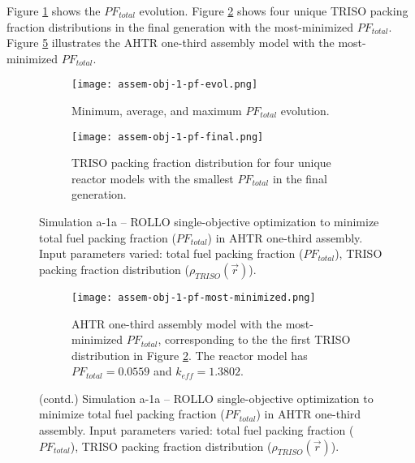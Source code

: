 Figure \ref{fig:assem-obj-1-pf-evol} shows the $PF_{total}$ evolution.
Figure \ref{fig:assem-obj-1-pf-final} shows four unique TRISO packing fraction distributions 
in the final generation with the most-minimized $PF_{total}$. 
Figure \ref{fig:assem-obj-1-pf-most-minimized} illustrates the \gls{AHTR} one-third 
assembly model with the most-minimized $PF_{total}$.
\begin{figure}[htbp!]
    \centering
    \begin{subfigure}{\textwidth}
        \texttt{[image: assem-obj-1-pf-evol.png]}
        \caption{Minimum, average, and maximum $PF_{total}$ evolution.}
        \label{fig:assem-obj-1-pf-evol} 
    \end{subfigure}
    \begin{subfigure}{\textwidth}
        \texttt{[image: assem-obj-1-pf-final.png]}
        \caption{TRISO packing fraction distribution for four unique reactor models with the 
        smallest $PF_{total}$ in the final generation.}
        \label{fig:assem-obj-1-pf-final} 
    \end{subfigure}
    \caption{Simulation a-1a -- ROLLO single-objective optimization to minimize total 
    fuel packing fraction ($PF_{total}$) in \gls{AHTR} one-third assembly. 
    Input parameters varied: total fuel packing fraction 
    ($PF_{total}$), \gls{TRISO} packing fraction distribution ($\rho_{TRISO}(\vec{r})$).}
    \label{fig:assem-obj-1-pf}
\end{figure}
\begin{figure}[htbp!]
    \ContinuedFloat
    \centering
    \begin{subfigure}{\textwidth}
        \texttt{[image: assem-obj-1-pf-most-minimized.png]}
        \caption{\gls{AHTR} one-third assembly model with the most-minimized 
        $PF_{total}$, corresponding to the the first TRISO distribution in Figure 
        \ref{fig:assem-obj-1-pf-final}. The reactor model has $PF_{total}=0.0559$
        and $k_{eff}=1.3802$.}
        \label{fig:assem-obj-1-pf-most-minimized} 
    \end{subfigure}
    \caption{(contd.) Simulation a-1a -- ROLLO single-objective optimization to minimize total 
    fuel packing fraction ($PF_{total}$) in \gls{AHTR} one-third assembly. 
    Input parameters varied: total fuel packing fraction 
    ($PF_{total}$), \gls{TRISO} packing fraction distribution ($\rho_{TRISO}(\vec{r})$).}
\end{figure}

